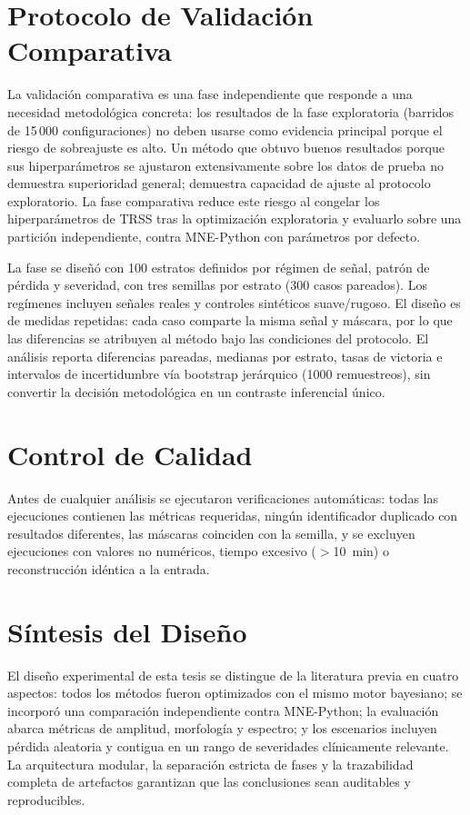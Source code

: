 \section{Protocolo de Validación Comparativa}
\label{sec:confirmatory}

La validación comparativa es una fase independiente que responde a una necesidad metodológica concreta: los resultados de la fase exploratoria (barridos de 15\,000 configuraciones) no deben usarse como evidencia principal porque el riesgo de sobreajuste es alto. Un método que obtuvo buenos resultados porque sus hiperparámetros se ajustaron extensivamente sobre los datos de prueba no demuestra superioridad general; demuestra capacidad de ajuste al protocolo exploratorio. La fase comparativa reduce este riesgo al congelar los hiperparámetros de TRSS tras la optimización exploratoria y evaluarlo sobre una partición independiente, contra MNE-Python con parámetros por defecto.

La fase se diseñó con 100 estratos definidos por régimen de señal, patrón de pérdida y severidad, con tres semillas por estrato (300 casos pareados). Los regímenes incluyen señales reales y controles sintéticos suave/rugoso. El diseño es de medidas repetidas: cada caso comparte la misma señal y máscara, por lo que las diferencias se atribuyen al método bajo las condiciones del protocolo. El análisis reporta diferencias pareadas, medianas por estrato, tasas de victoria e intervalos de incertidumbre vía bootstrap jerárquico (1000 remuestreos), sin convertir la decisión metodológica en un contraste inferencial único.

\section{Control de Calidad}

Antes de cualquier análisis se ejecutaron verificaciones automáticas: todas las ejecuciones contienen las métricas requeridas, ningún identificador duplicado con resultados diferentes, las máscaras coinciden con la semilla, y se excluyen ejecuciones con valores no numéricos, tiempo excesivo ($>$10~min) o reconstrucción idéntica a la entrada.

\section{Síntesis del Diseño}

El diseño experimental de esta tesis se distingue de la literatura previa en cuatro aspectos: todos los métodos fueron optimizados con el mismo motor bayesiano; se incorporó una comparación independiente contra MNE-Python; la evaluación abarca métricas de amplitud, morfología y espectro; y los escenarios incluyen pérdida aleatoria y contigua en un rango de severidades clínicamente relevante. La arquitectura modular, la separación estricta de fases y la trazabilidad completa de artefactos garantizan que las conclusiones sean auditables y reproducibles.

